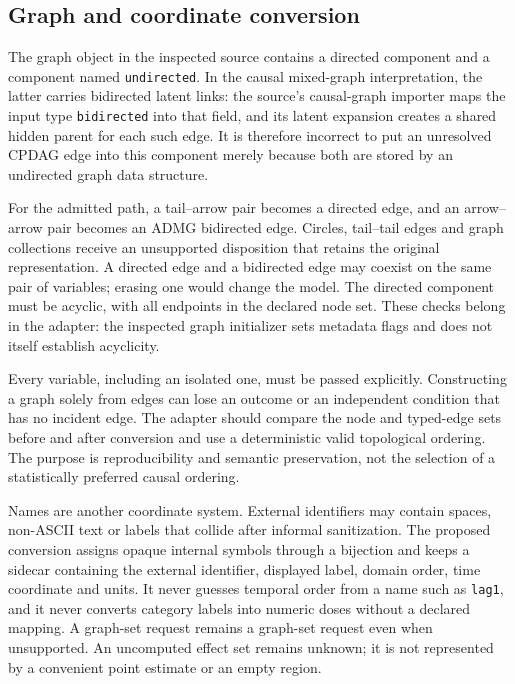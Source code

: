 \hypertarget{graph-and-coordinate-conversion}{%
\subsection{Graph and coordinate
conversion}\label{graph-and-coordinate-conversion}}

The graph object in the inspected source contains a directed component
and a component named \texttt{undirected}. In the causal mixed-graph
interpretation, the latter carries bidirected latent links: the source's
causal-graph importer maps the input type \texttt{bidirected} into that
field, and its latent expansion creates a shared hidden parent for each
such edge. It is therefore incorrect to put an unresolved CPDAG edge
into this component merely because both are stored by an undirected
graph data structure. \citep{exec13_y0_graph}

For the admitted path, a tail--arrow pair becomes a directed edge, and
an arrow--arrow pair becomes an ADMG bidirected edge. Circles,
tail--tail edges and graph collections receive an unsupported
disposition that retains the original representation. A directed edge
and a bidirected edge may coexist on the same pair of variables; erasing
one would change the model. The directed component must be acyclic, with
all endpoints in the declared node set. These checks belong in the
adapter: the inspected graph initializer sets metadata flags and does
not itself establish acyclicity.

Every variable, including an isolated one, must be passed explicitly.
Constructing a graph solely from edges can lose an outcome or an
independent condition that has no incident edge. The adapter should
compare the node and typed-edge sets before and after conversion and use
a deterministic valid topological ordering. The purpose is
reproducibility and semantic preservation, not the selection of a
statistically preferred causal ordering.

Names are another coordinate system. External identifiers may contain
spaces, non-ASCII text or labels that collide after informal
sanitization. The proposed conversion assigns opaque internal symbols
through a bijection and keeps a sidecar containing the external
identifier, displayed label, domain order, time coordinate and units. It
never guesses temporal order from a name such as \texttt{lag1}, and it
never converts category labels into numeric doses without a declared
mapping. A graph-set request remains a graph-set request even when
unsupported. An uncomputed effect set remains unknown; it is not
represented by a convenient point estimate or an empty region.

